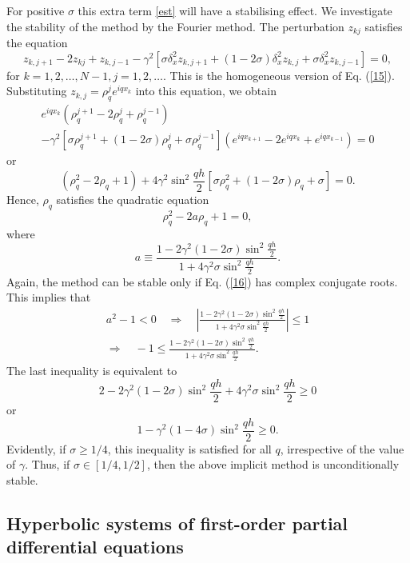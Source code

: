For positive $\sigma$ this extra term \eqref{est} will have a stabilising
effect.
We investigate the stability of the
method by the Fourier method. The perturbation
$z_{kj}$ satisfies the equation
\[
z_{k,j+1}-2z_{kj}+z_{k,j-1}-\gamma^{2} \left[\sigma \delta_{x}^2
z_{k,j+1}+(1-2\sigma)\delta_{x}^2 z_{k,j} +\sigma \delta_{x}^2
z_{k,j-1}\right]=0, 
\]
for  $k=1,2, \dots, N-1, j=1,2, \dots$.
This is the homogeneous version of Eq. (\ref{15}). Substituting
$z_{k,j}=\rho_{q}^{j}e^{iqx_{k}}$ into this equation, we obtain
\begin{multline*}
e^{iqx_{k}}\left(\rho_{q}^{j+1}-2\rho_{q}^{j}+\rho_{q}^{j-1}\right)\\-
\gamma^{2}\left[\sigma\rho_{q}^{j+1}+(1-2\sigma)\rho_{q}^{j}+\sigma\rho_{q}^{j-1}\right]
\left(e^{iqx_{k+1}}-2e^{iqx_{k}}+e^{iqx_{k-1}}\right)=0
\end{multline*}
or
\[
\left(\rho_{q}^{2}-2\rho_{q}+1\right)+
4\gamma^{2}\sin^{2}\frac{qh}{2}\left[\sigma\rho_{q}^{2}+(1-2\sigma)\rho_{q}+\sigma\right]=0.
\]
Hence, $\rho_{q}$ satisfies the quadratic equation
\begin{equation}
\rho_{q}^{2}-2a\rho_{q}+1=0, \label{16}
\end{equation}
where
\[
a\equiv
\frac{1-2\gamma^{2}(1-2\sigma)\sin^{2}\frac{qh}{2}}{1+4\gamma^{2}\sigma\sin^{2}\frac{qh}{2}}.
\]
Again, the method can be stable only if Eq. (\ref{16}) has complex
conjugate roots. This implies that
\begin{multline*}
a^{2}-1<0 \quad \Rightarrow \quad \left\vert
\frac{1-2\gamma^{2}(1-2\sigma)\sin^{2}\frac{qh}{2}}{1+4\gamma^{2}\sigma\sin^{2}\frac{qh}{2}}
\right\vert \leq 1 \\ 
\Rightarrow \quad -1\leq
\frac{1-2\gamma^{2}(1-2\sigma)\sin^{2}\frac{qh}{2}}{1+4\gamma^{2}\sigma\sin^{2}\frac{qh}{2}}.
\end{multline*}
The last inequality is equivalent to
\[
2-2\gamma^{2}(1-2\sigma)\sin^{2}\frac{qh}{2}+4\gamma^{2}\sigma\sin^{2}\frac{qh}{2}\geq
0
\]
or
\[
1-\gamma^{2}(1-4\sigma)\sin^{2}\frac{qh}{2}\geq 0.
\]
Evidently, if $\sigma \geq 1/4$, this inequality is satisfied for
all $q$, irrespective of the value of $\gamma$. Thus, if
$\sigma\in[1/4,1/2]$, then the above implicit method is
unconditionally stable.



\subsection{Hyperbolic systems of first-order
partial differential equations}

